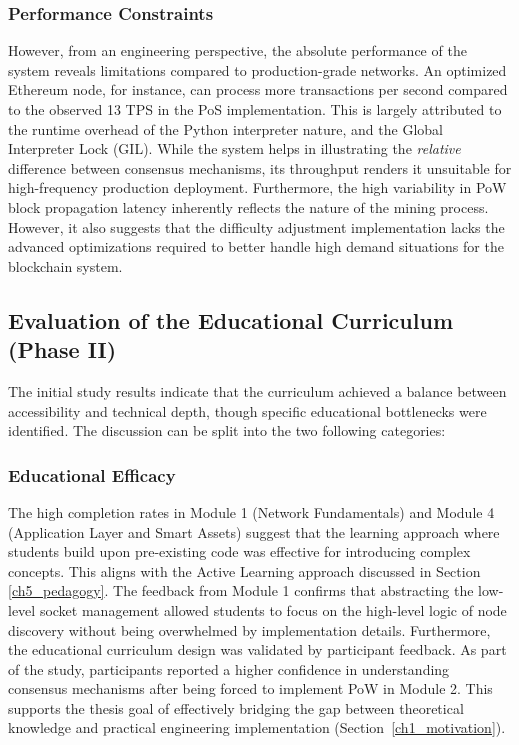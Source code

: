 \subsubsection{Performance Constraints}
However, from an engineering perspective, the absolute performance of the system reveals limitations compared to production-grade networks. An optimized Ethereum node, for instance, can process more transactions per second compared to the observed 13 TPS in the PoS implementation. This is largely attributed to the runtime overhead of the Python interpreter nature, and the Global Interpreter Lock (GIL). While the system helps in illustrating the \textit{relative} difference between consensus mechanisms, its throughput renders it unsuitable for high-frequency production deployment. Furthermore, the high variability in PoW block propagation latency inherently reflects the nature of the mining process. However, it also suggests that the difficulty adjustment implementation lacks the advanced optimizations required to better handle high demand situations for the blockchain system.
\newpage
\subsection{Evaluation of the Educational Curriculum (Phase II)}
The initial study results indicate that the curriculum achieved a balance between accessibility and technical depth, though specific educational bottlenecks were identified. The discussion can be split into the two following categories:

\subsubsection{Educational Efficacy}
The high completion rates in Module 1 (Network Fundamentals) and Module 4 (Application Layer and Smart Assets) suggest that the learning approach where students build upon pre-existing code was effective for introducing complex concepts. This aligns with the Active Learning approach discussed in Section \ref{ch5_pedagogy}. The feedback from Module 1 confirms that abstracting the low-level socket management allowed students to focus on the high-level logic of node discovery without being overwhelmed by implementation details. Furthermore, the educational curriculum design was validated by participant feedback. As part of the study, participants reported a higher confidence in understanding consensus mechanisms after being forced to implement PoW in Module 2. This supports the thesis goal of effectively bridging the gap between theoretical knowledge and practical engineering implementation (Section~\ref{ch1_motivation}).


